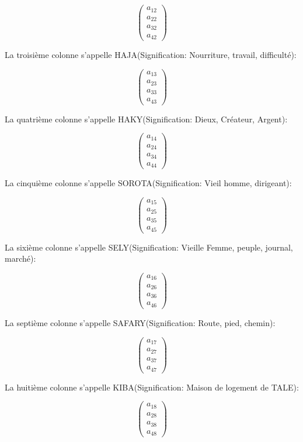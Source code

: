 \documentclass[12pt]{report}
\begin{document}
\[
\begin{pmatrix}
a_{12}\\
a_{22}\\
a_{32}\\
a_{42}
\end{pmatrix}
\] 

La troisième colonne s'appelle HAJA(Signification: Nourriture, travail, difficulté):

\[
\begin{pmatrix}
a_{13}\\
a_{23}\\
a_{33}\\
a_{43}
\end{pmatrix}
\]

La quatrième colonne s'appelle HAKY(Signification: Dieux, Créateur, Argent):

\[
\begin{pmatrix}
a_{14}\\
a_{24}\\
a_{34}\\
a_{44}
\end{pmatrix}
\]

La cinquième colonne s'appelle SOROTA(Signification: Vieil homme, dirigeant):

\[
\begin{pmatrix}
a_{15}\\
a_{25}\\
a_{35}\\
a_{45}
\end{pmatrix}
\]

La sixième colonne s'appelle SELY(Signification: Vieille Femme, peuple, journal, marché):

\[
\begin{pmatrix}
a_{16}\\
a_{26}\\
a_{36}\\
a_{46}
\end{pmatrix}
\]

La septième colonne s'appelle SAFARY(Signification: Route, pied, chemin):

\[
\begin{pmatrix}
a_{17}\\
a_{27}\\
a_{37}\\
a_{47}
\end{pmatrix}
\]

La huitième colonne s'appelle KIBA(Signification: Maison de logement de TALE):

\[
\begin{pmatrix}
a_{18}\\
a_{28}\\
a_{38}\\
a_{48}
\end{pmatrix}
\]
\end{document}
